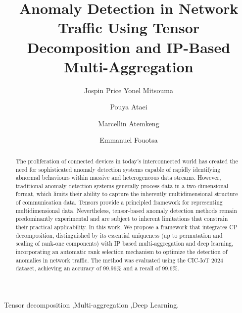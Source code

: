 \documentclass[preprint,12pt,authoryear]{elsarticle}
\begin{document}
\begin{frontmatter}

\title{\textbf{Anomaly Detection in Network Traffic Using Tensor Decomposition and IP-Based Multi-Aggregation}}

\author[label1]{Jospin Price Yonel Mitsouma}
\author[label2]{Pouya Ataei}
\author[label3,label4]{Marcellin Atemkeng}
\author[label1]{Emmanuel Fouotsa}






\begin{abstract}
The proliferation of connected devices in today’s interconnected world has created the need for sophisticated anomaly detection systems capable of rapidly identifying abnormal behaviours within massive and heterogeneous data streams. However, traditional anomaly detection systems generally process data in a two-dimensional format, which limits their ability to capture the inherently multidimensional structure of communication data. Tensors provide a principled framework for representing multidimensional data. Nevertheless, tensor-based anomaly detection methods remain predominantly experimental and are subject to inherent limitations that constrain their practical applicability. 
In this work, We propose a framework that integrates CP decomposition, distinguished by its essential uniqueness (up to permutation and scaling of rank-one components) with IP based multi-aggregation and deep learning, incorporating an automatic rank selection mechanism to optimize the detection of anomalies in network traffic. The method was evaluated using the CIC-IoT 2024 dataset, achieving an accuracy of 99.96\% and a recall of 99.6\%.   
\end{abstract}

\begin{keyword} 
Tensor decomposition \sep Multi-aggregation  \sep Deep Learning.
\end{keyword}

\end{frontmatter}
\end{document}
